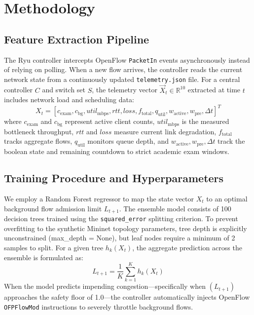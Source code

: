 \documentclass[journal]{IEEEtran}
\begin{document}
\section{Methodology}

\subsection{Feature Extraction Pipeline}
The Ryu controller intercepts OpenFlow \texttt{PacketIn} events asynchronously instead of relying on polling. When a new flow arrives, the controller reads the current network state from a continuously updated \texttt{telemetry.json} file. For a central controller $C$ and switch set $S$, the telemetry vector $\vec{X}_t \in \mathbb{R}^{10}$ extracted at time $t$ includes network load and scheduling data:
\begin{equation}
X_{t} = [c_{\text{exam}}, c_{\text{bg}}, util_{\text{mbps}}, rtt, loss, f_{\text{total}}, q_{\text{util}}, w_{\text{active}}, w_{\text{pre}}, \Delta t]^T
\end{equation}
where $c_{\text{exam}}$ and $c_{\text{bg}}$ represent active client counts, $util_{\text{mbps}}$ is the measured bottleneck throughput, $rtt$ and $loss$ measure current link degradation, $f_{\text{total}}$ tracks aggregate flows, $q_{\text{util}}$ monitors queue depth, and $w_{\text{active}}, w_{\text{pre}}, \Delta t$ track the boolean state and remaining countdown to strict academic exam windows.

\subsection{Training Procedure and Hyperparameters}
We employ a Random Forest regressor to map the state vector $X_{t}$ to an optimal background flow admission limit $L_{t+1}$. The ensemble model consists of 100 decision trees trained using the \texttt{squared\_error} splitting criterion. To prevent overfitting to the synthetic Mininet topology parameters, tree depth is explicitly unconstrained (max\_depth = None), but leaf nodes require a minimum of 2 samples to split. For a given tree $h_{k}(X_{t})$, the aggregate prediction across the ensemble is formulated as:
\begin{equation}
L_{t+1} = \frac{1}{K} \sum_{k=1}^{K} h_{k}(X_{t})
\end{equation}
When the model predicts impending congestion—specifically when $(L_{t+1})$ approaches the safety floor of 1.0—the controller automatically injects OpenFlow \texttt{OFPFlowMod} instructions to severely throttle background flows.
\end{document}
